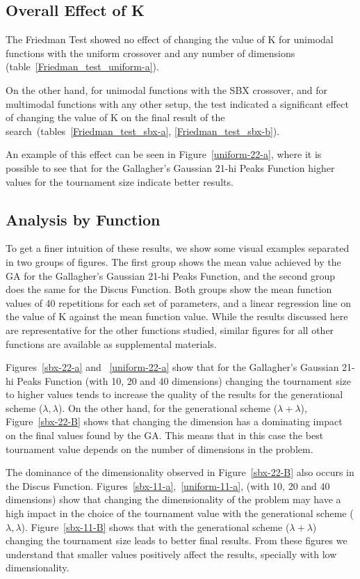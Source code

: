 \subsection{Overall Effect of K}

The Friedman Test showed no effect of changing the value of K
for unimodal functions with the uniform crossover and any
number of dimensions (table~\ref{Friedman_test_uniform-a}). 

On the other hand, for unimodal functions with the SBX crossover, and
for multimodal functions with any other setup, the test indicated a
significant effect of changing the value of K on the final result of
the search~(tables~\ref{Friedman_test_sbx-a}, \ref{Friedman_test_sbx-b}). 

An example of this effect can be seen in Figure~\ref{uniform-22-a},
where it is possible to see that for the Gallagher's Gaussian 21-hi
Peaks Function higher values for the tournament size indicate better
results.

\subsection{Analysis by Function}

To get a finer intuition of these results, we show some visual
examples separated in two groups of figures. The first group shows the
mean value achieved by the GA for the Gallagher's Gaussian 21-hi Peaks
Function, and the second group does the same for the Discus
Function. Both groups show the mean function values of 40 repetitions
for each set of parameters, and a linear regression line on the value
of K against the mean function value. While the results discussed here
are representative for the other functions studied, similar figures
for all other functions are available as supplemental materials.

Figures~\ref{sbx-22-a} and ~\ref{uniform-22-a} show that for the
Gallagher's Gaussian 21-hi Peaks Function (with 10, 20 and 40
dimensions) changing the tournament size to higher values tends to
increase the quality of the results for the generational scheme
($\lambda, \lambda$). On the other hand, for the generational scheme
($\lambda + \lambda$), Figure~\ref{sbx-22-B} shows that changing the
dimension has a dominating impact on the final values found by the
GA. This means that in this case the best tournament value depends on
the number of dimensions in the problem.

The dominance of the dimensionality observed in Figure~\ref{sbx-22-B}
also occurs in the Discus Function.
Figures~\ref{sbx-11-a},~\ref{uniform-11-a}, (with 10, 20 and 40
dimensions) show that changing the dimensionality of the problem may
have a high impact in the choice of the tournament value with the
generational scheme ($\lambda, \lambda$). Figure~\ref{sbx-11-B} shows
that with the generational scheme ($\lambda + \lambda$) changing the
tournament size leads to better final results. From these figures we
understand that smaller values positively affect the results,
specially with low dimensionality.

